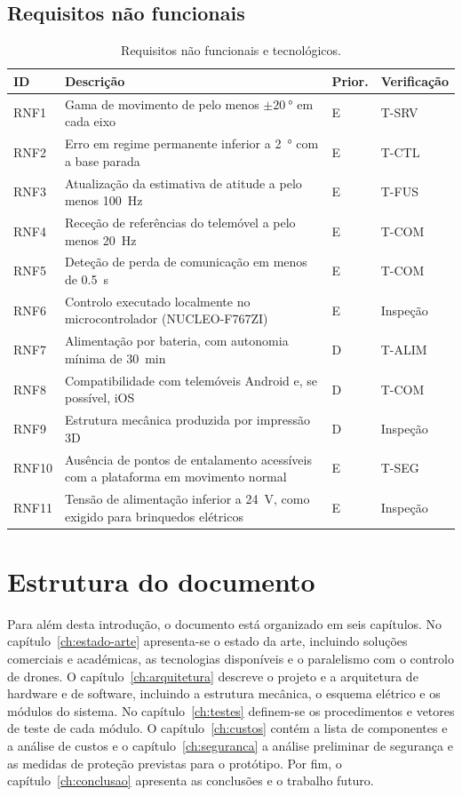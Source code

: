 \subsection{Requisitos não funcionais}
\begin{table}[H]
\centering\small
\caption{Requisitos não funcionais e tecnológicos.}
\begin{tabularx}{\textwidth}{p{1.1cm}Yp{1.2cm}p{2.2cm}}
\toprule
ID & Descrição & Prior. & Verificação\\\midrule
RNF1 & Gama de movimento de pelo menos $\pm\SI{20}{\degree}$ em cada eixo & E & T-SRV\\
RNF2 & Erro em regime permanente inferior a \SI{2}{\degree} com a base parada & E & T-CTL\\
RNF3 & Atualização da estimativa de atitude a pelo menos \SI{100}{\hertz} & E & T-FUS\\
RNF4 & Receção de referências do telemóvel a pelo menos \SI{20}{\hertz} & E & T-COM\\
RNF5 & Deteção de perda de comunicação em menos de \SI{0.5}{\second} & E & T-COM\\
RNF6 & Controlo executado localmente no microcontrolador (NUCLEO-F767ZI) & E & Inspeção\\
RNF7 & Alimentação por bateria, com autonomia mínima de \SI{30}{\minute} & D & T-ALIM\\
RNF8 & Compatibilidade com telemóveis Android e, se possível, iOS & D & T-COM\\
RNF9 & Estrutura mecânica produzida por impressão 3D & D & Inspeção\\
RNF10 & Ausência de pontos de entalamento acessíveis com a plataforma em movimento normal & E & T-SEG\\
RNF11 & Tensão de alimentação inferior a \SI{24}{\volt}, como exigido para brinquedos elétricos & E & Inspeção\\
\bottomrule
\end{tabularx}
\label{tab:rnf}
\end{table}

\section{Estrutura do documento}
Para além desta introdução, o documento está organizado em seis capítulos. No capítulo~\ref{ch:estado-arte} apresenta-se o estado da arte, incluindo soluções comerciais e académicas, as tecnologias disponíveis e o paralelismo com o controlo de drones. O capítulo~\ref{ch:arquitetura} descreve o projeto e a arquitetura de hardware e de software, incluindo a estrutura mecânica, o esquema elétrico e os módulos do sistema. No capítulo~\ref{ch:testes} definem-se os procedimentos e vetores de teste de cada módulo. O capítulo~\ref{ch:custos} contém a lista de componentes e a análise de custos e o capítulo~\ref{ch:seguranca} a análise preliminar de segurança e as medidas de proteção previstas para o protótipo. Por fim, o capítulo~\ref{ch:conclusao} apresenta as conclusões e o trabalho futuro.
